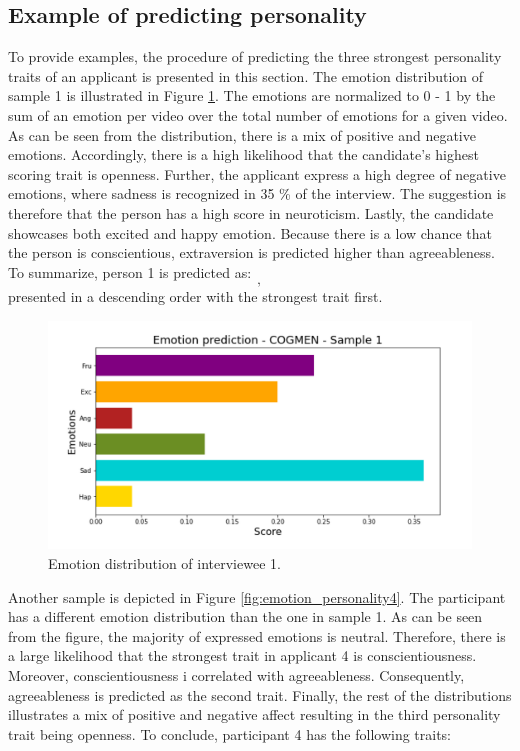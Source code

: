 \subsection{Example of predicting personality}
To provide examples, the procedure of predicting the three strongest personality traits of an applicant is presented in this section. The emotion distribution of sample 1 is illustrated in Figure \ref{fig:emotion_personality1}. The emotions are normalized to 0 - 1 by the sum of an emotion per video over the total number of emotions for a given video. As can be seen from the distribution, there is a mix of positive and negative emotions. Accordingly, there is a high likelihood that the candidate's highest scoring trait is openness. Further, the applicant express a high degree of negative emotions, where sadness is recognized in 35 \% of the interview. The suggestion is therefore that the person has a high score in neuroticism. Lastly, the candidate showcases both excited and happy emotion. Because there is a low chance that the person is conscientious, extraversion is predicted higher than agreeableness. To summarize, person 1 is predicted as:
%
\begin{equation*}
    [Openness, Neuroticism, Extraversion],
\end{equation*}
%
presented in a descending order with the strongest trait first.
%
\begin{figure}[h]
  \centering
  \includegraphics[width=\textwidth]{figures/emotion_distribution_sample1.png}
  \caption{Emotion distribution of interviewee 1.}
  \label{fig:emotion_personality1}
\end{figure}
%
\newline
\indent Another sample is depicted in Figure \ref{fig:emotion_personality4}. The participant has a different emotion distribution than the one in sample 1. As can be seen from the figure, the majority of expressed emotions is neutral. Therefore, there is a large likelihood that the strongest trait in applicant 4 is conscientiousness. Moreover, conscientiousness i correlated with agreeableness. Consequently, agreeableness is predicted as the second trait. Finally, the rest of the distributions illustrates a mix of positive and negative affect resulting in the third personality trait being openness. To conclude, participant 4 has the following traits:
